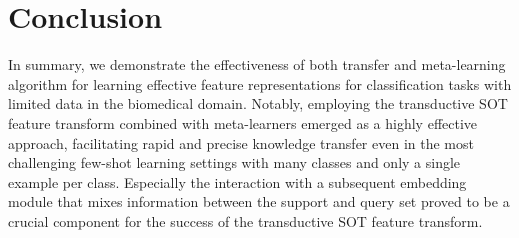 \section{Conclusion}

In summary, we demonstrate the effectiveness of both transfer and meta-learning algorithm for learning effective feature representations for classification tasks with limited data in the biomedical domain. 
Notably, employing the transductive SOT feature transform combined with meta-learners emerged as a highly effective approach, facilitating rapid and precise knowledge transfer even in the most challenging few-shot learning settings with many classes and only a single example per class. Especially the interaction with a subsequent embedding module that mixes information between the support and query set proved to be a crucial component for the success of the transductive SOT feature transform.